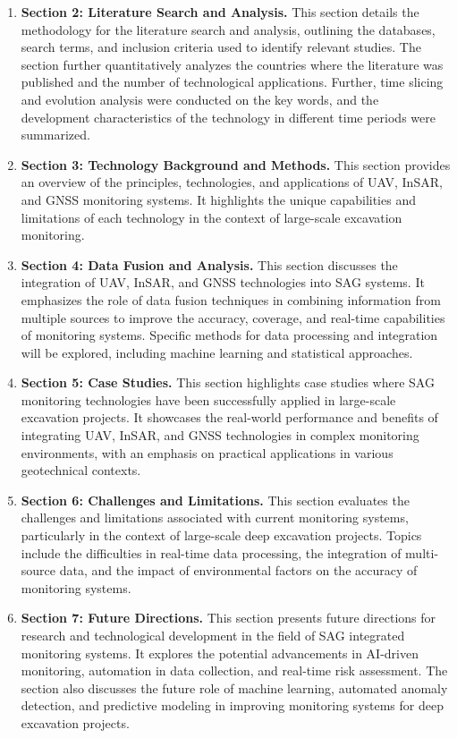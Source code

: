 \documentclass[preprint,11pt,authoryear,3p]{elsarticle}
\begin{document}
\begin{enumerate}
    \item \textbf{Section 2: Literature Search and Analysis.} This section details the methodology for the literature search and analysis, outlining the databases, search terms, and inclusion criteria used to identify relevant studies. The section further quantitatively analyzes the countries where the literature was published and the number of technological applications. Further, time slicing and evolution analysis were conducted on the key words, and the development characteristics of the technology in different time periods were summarized.
  
    \item \textbf{Section 3: Technology Background and Methods.} This section provides an overview of the principles, technologies, and applications of UAV, InSAR, and GNSS monitoring systems. It highlights the unique capabilities and limitations of each technology in the context of large-scale excavation monitoring.
    
    \item \textbf{Section 4: Data Fusion and Analysis.} This section discusses the integration of UAV, InSAR, and GNSS technologies into SAG systems. It emphasizes the role of data fusion techniques in combining information from multiple sources to improve the accuracy, coverage, and real-time capabilities of monitoring systems. Specific methods for data processing and integration will be explored, including machine learning and statistical approaches.

    \item \textbf{Section 5: Case Studies.} This section highlights case studies where SAG monitoring technologies have been successfully applied in large-scale excavation projects. It showcases the real-world performance and benefits of integrating UAV, InSAR, and GNSS technologies in complex monitoring environments, with an emphasis on practical applications in various geotechnical contexts.
    
    \item \textbf{Section 6: Challenges and Limitations.} This section evaluates the challenges and limitations associated with current monitoring systems, particularly in the context of large-scale deep excavation projects. Topics include the difficulties in real-time data processing, the integration of multi-source data, and the impact of environmental factors on the accuracy of monitoring systems.
    
    \item \textbf{Section 7: Future Directions.} This section presents future directions for research and technological development in the field of SAG integrated monitoring systems. It explores the potential advancements in AI-driven monitoring, automation in data collection, and real-time risk assessment. The section also discusses the future role of machine learning, automated anomaly detection, and predictive modeling in improving monitoring systems for deep excavation projects.
\end{enumerate}
\end{document}
